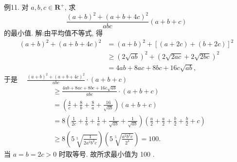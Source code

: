 例11. 对 $a, b, c \in \mathbf{R}^{+}$, 求
$$
\frac{(a+b)^2+(a+b+4 c)^2}{a b c}(a+b+c)
$$
的最小值.
解:由平均值不等式, 得
$$
\begin{aligned}
(a+b)^2+(a+b+4 c)^2 & =(a+b)^2+[(a+2 c)+(b+2 c)]^2 \\
& \geqslant(2 \sqrt{a b})^2+(2 \sqrt{2 a c}+2 \sqrt{2 b c})^2 \\
& =4 a b+8 a c+8 b c+16 c \sqrt{a b},
\end{aligned}
$$
于是 $\quad \frac{(a+b)^2+(a+b+4 c)^2}{a b c} \cdot(a+b+c)$
$$
\begin{aligned}
& \geqslant \frac{4 a b+8 a c+8 b c+16 c \sqrt{a b}}{a b c} \cdot(a+b+c) \\
& =\left(\frac{4}{c}+\frac{8}{b}+\frac{8}{a}+\frac{16}{\sqrt{a b}}\right)(a+b+c) \\
& =8\left(\frac{1}{2 c}+\frac{1}{b}+\frac{1}{a}+\frac{1}{\sqrt{a b}}+\frac{1}{\sqrt{a b}}\right)\left(\frac{a}{2}+\frac{a}{2}+\frac{b}{2}+\frac{b}{2}+c\right) \\
& \geqslant 8\left(5 \sqrt[5]{\frac{1}{2 a^2 b^2 c}}\right)\left(5 \sqrt[5]{\frac{a^2 b^2 c}{2^4}}\right)=100 .
\end{aligned}
$$
当 $a=b=2 c>0$ 时取等号.
故所求最小值为 100 .


